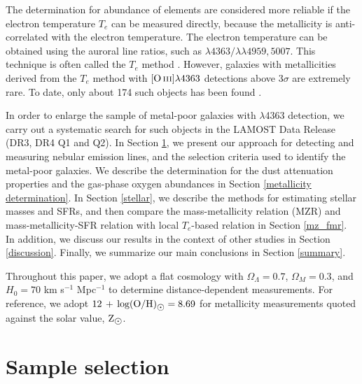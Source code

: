 \documentclass[usenatbib]{raa}
\begin{document}
The determination for abundance of elements are considered more reliable if the electron
temperature $T_e$ can be measured directly, because the metallicity is anti-correlated with
the electron temperature. The electron temperature can be obtained  using the auroral line
ratios, such as \oiii$\lambda4363/$\oiii$\lambda\lambda4959,5007$. 
This technique is often called the $T_e$  method \citep{1984ASSL..112.....A}. 
   However, galaxies with metallicities derived
from the $T_e$ method with $\hbox{[O\,{\sc iii}]}\lambda4363$ detections above 3$\sigma$ are extremely rare. 
To date, only  about 174 such objects  has been 
found \citep{2014ApJ...780..122L, 2016ApJ...828...67L}.

In order to enlarge  the sample  of  metal-poor galaxies  with 
\oiii$\lambda$4363 detection, we carry out a systematic search for such objects 
in the LAMOST Data Release (DR3, DR4 Q1 and Q2).  In Section \ref{sect:Sample}, we present
our approach for detecting and measuring nebular emission lines, and the selection 
criteria used to identify the metal-poor galaxies.  We describe the determination
for the dust attenuation properties and the gas-phase oxygen abundances in Section
\ref{metallicity determination}.
In Section \ref{stellar}, we describe the methods for estimating 
stellar masses and SFRs, and then compare the 
mass-metallicity relation (MZR) and mass-metallicity-SFR relation
 with local $T_e$-based relation  in Section \ref{mz_fmr}. In addition, we 
discuss our results in the context of other studies in Section 
\ref{discussion}. 
Finally, we summarize our main conclusions in Section \ref{summary}.    

Throughout this paper, we adopt a flat cosmology with $\Omega_\Lambda=0.7$,  
$\Omega _M=0.3$,  and $H_0=70$ km s$^{-1}$ Mpc$^{-1}$ to determine 
distance-dependent measurements.  For reference,  we adopt 
$\hbox{$12\, +\, {\rm log(O/H)}$}_{\hbox{$\odot$}} = 8.69$ \citep{2001ApJ...556L..63A} for metallicity 
measurements quoted against the solar value, $\hbox{${\rm Z}_{\hbox{$\odot$}}$}$. 
\section{Sample selection}
\label{sect:Sample}
\end{document}
